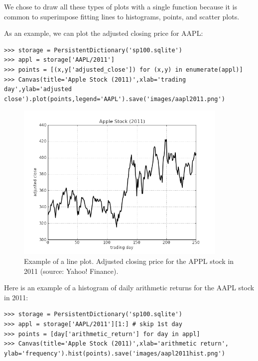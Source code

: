 \documentclass[justified,sixbynine]{tufte-book}
\def\ft{\small\tt}
\theoremstyle{plain}%
\theoremstyle{definition}
\theoremstyle{remark}
\begin{document}
\begin{fullwidth}
We chose to draw all these types of plots with a single function because it is common to superimpose fitting lines to histograms, points, and scatter plots.

As an example, we can plot the adjusted closing price for AAPL:

\begin{lstlisting}[caption={in file: {\ft nlib.py}}]
>>> storage = PersistentDictionary('sp100.sqlite')
>>> appl = storage['AAPL/2011']
>>> points = [(x,y['adjusted_close']) for (x,y) in enumerate(appl)]
>>> Canvas(title='Apple Stock (2011)',xlab='trading day',ylab='adjusted close').plot(points,legend='AAPL').save('images/aapl2011.png')
\end{lstlisting}

\begin{figure}[ht]
\centering\includegraphics[width=4in]{images/aapl2011.png}
\caption{Example of a line plot. Adjusted closing price for the APPL stock in 2011 (source: Yahoo! Finance).}
\end{figure}

Here is an example of a histogram of daily arithmetic returns for the AAPL stock in 2011:

\begin{lstlisting}[caption={in file: {\ft nlib.py}}]
>>> storage = PersistentDictionary('sp100.sqlite')
>>> appl = storage['AAPL/2011'][1:] # skip 1st day
>>> points = [day['arithmetic_return'] for day in appl]
>>> Canvas(title='Apple Stock (2011)',xlab='arithmetic return', ylab='frequency').hist(points).save('images/aapl2011hist.png')
\end{lstlisting}


\end{fullwidth}
\end{document}
